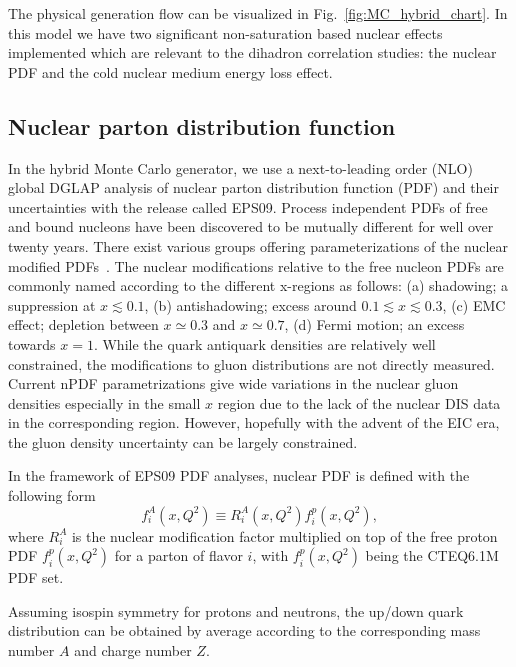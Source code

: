The physical generation flow can be visualized in Fig.~\ref{fig:MC_hybrid_chart}.
In this model we have two significant non-saturation based nuclear effects implemented which are relevant to the dihadron correlation studies: the nuclear PDF and the cold nuclear medium energy loss effect.

\subsection{Nuclear parton distribution function}
In the hybrid Monte Carlo generator, we use a next-to-leading order (NLO) global
DGLAP analysis of nuclear parton distribution function (PDF) and their uncertainties with the release called
EPS09. Process independent PDFs of free and bound nucleons
have been discovered to be mutually different for well over twenty years. There
exist various groups offering parameterizations of the nuclear modified PDFs~\cite{Hirai:2004wq,deFlorian:2003qf}.
The nuclear modifications relative to the free nucleon PDFs are commonly named
according to the different x-regions as follows: (a) shadowing; a suppression at
$x\lesssim 0.1$, (b) antishadowing; excess around $0.1\lesssim x \lesssim 0.3$,
(c) EMC effect; depletion between $x\simeq 0.3$ and $x \simeq 0.7$, (d) Fermi
motion; an excess towards $x=1$. While the quark antiquark densities are
relatively well constrained, the modifications to gluon distributions are not
directly measured. Current nPDF parametrizations give wide variations in the
nuclear gluon densities especially in the small $x$ region due to the lack of the
nuclear DIS data in the corresponding region. However, hopefully with the advent
of the EIC era, the gluon density uncertainty can be largely constrained.

In the framework of EPS09 PDF analyses, nuclear PDF is defined with the following form
\begin{equation}
f^{A}_{i}(x, Q^{2}) \equiv R^{A}_{i}(x, Q^{2})f^{p}_{i}(x, Q^{2}),
\end{equation} 
where $R^{A}_{i}$ is the nuclear modification factor multiplied on top of the
free proton PDF $f^{p}_{i}(x, Q^{2})$ for a parton of flavor $i$, 
with $f^{p}_{i}(x, Q^{2})$ being the CTEQ6.1M PDF set. 


Assuming isospin symmetry for protons and neutrons, the up/down quark
distribution can be obtained by average according to the corresponding mass
number $A$ and charge number $Z$.



